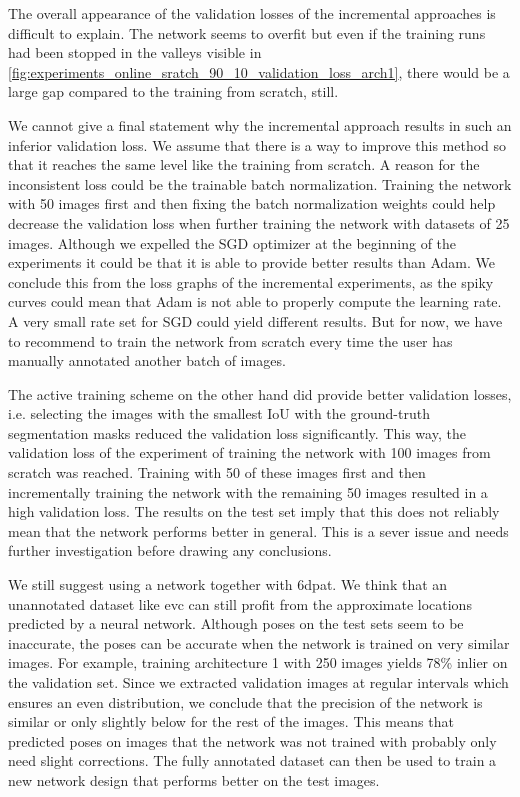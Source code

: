 The overall appearance of the validation losses of the incremental approaches is difficult to explain. The network seems to overfit but even if the training runs had been stopped in the valleys visible in \fig \ref{fig:experiments_online_sratch_90_10_validation_loss_arch1}, there would be a large gap compared to the training from scratch, still.

We cannot give a final statement why the incremental approach results in such an inferior validation loss. We assume that there is a way to improve this method so that it reaches the same level like the training from scratch. A reason for the inconsistent loss could be the trainable batch normalization. Training the network with 50 images first and then fixing the batch normalization weights could help decrease the validation loss when further training the network with datasets of 25 images. Although we expelled the SGD optimizer at the beginning of the experiments it could be that it is able to provide better results than Adam. We conclude this from the loss graphs of the incremental experiments, as the spiky curves could mean that Adam is not able to properly compute the learning rate. A very small rate set for SGD could yield different results. But for now, we have to recommend to train the network from scratch every time the user has manually annotated another batch of images.

The active training scheme on the other hand did provide better validation losses, i.e. selecting the images with the smallest IoU with the ground-truth segmentation masks reduced the validation loss significantly. This way, the validation loss of the experiment of training the network with 100 images from scratch was reached. Training with 50 of these images first and then incrementally training the network with the remaining 50 images resulted in a high validation loss. The results on the test set imply that this does not reliably mean that the network performs better in general. This is a sever issue and needs further investigation before drawing any conclusions.

We still suggest using a network together with \ac{6dpat}. We think that an unannotated dataset like \ac{evc} can still profit from the approximate locations predicted by a neural network. Although poses on the test sets seem to be inaccurate, the poses can be accurate when the network is trained on very similar images. For example, training architecture 1 with 250 images yields 78\% inlier on the validation set. Since we extracted validation images at regular intervals which ensures an even distribution, we conclude that the precision of the network is similar or only slightly below for the rest of the images. This means that predicted poses on images that the network was not trained with probably only need slight corrections. The fully annotated dataset can then be used to train a new network design that performs better on the test images.